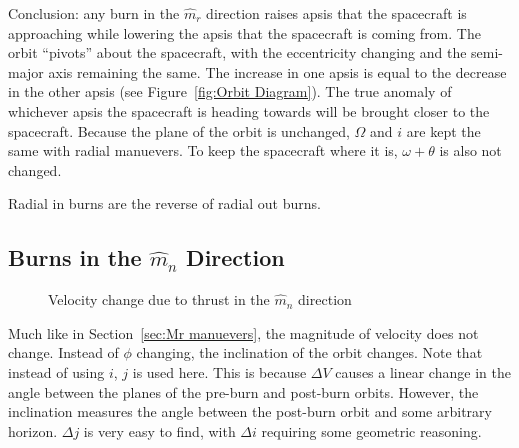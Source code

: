 \documentclass[../basicOrbitalDynamics.tex]{subfiles}
\begin{document}
Conclusion: any burn in the $\hat{m}_r$ direction raises apsis that the spacecraft is approaching while lowering the apsis that the spacecraft is coming from. The orbit ``pivots'' about the spacecraft, with the eccentricity changing and the semi-major axis remaining the same. The increase in one apsis is equal to the decrease in the other apsis (see Figure~\ref{fig:Orbit Diagram}). The true anomaly of whichever apsis the spacecraft is heading towards will be brought closer to the spacecraft. Because the plane of the orbit is unchanged, $\Omega$ and $i$ are kept the same with radial manuevers. To keep the spacecraft where it is, $\omega+\theta$ is also not changed.

Radial in burns are the reverse of radial out burns.

\bigskip\bigskip
\subsection{Burns in the \texorpdfstring{$\hat{m}_n$}{Normal} Direction}\label{sec:Mn Manuever}

\begin{figure}[H]
    \centering
    \caption{Velocity change due to thrust in the $\hat{m}_n$ direction}\label{fig:dV Triangle Mn}
\end{figure}

Much like in Section~\ref{sec:Mr manuevers}, the magnitude of velocity does not change. Instead of $\phi$ changing, the inclination of the orbit changes. Note that instead of using $i$, $j$ is used here. This is because $\Delta V$ causes a linear change in the angle between the planes of the pre-burn and post-burn orbits. However, the inclination measures the angle between the post-burn orbit and some arbitrary horizon. $\Delta j$ is very easy to find, with $\Delta i$ requiring some geometric reasoning.
\end{document}
